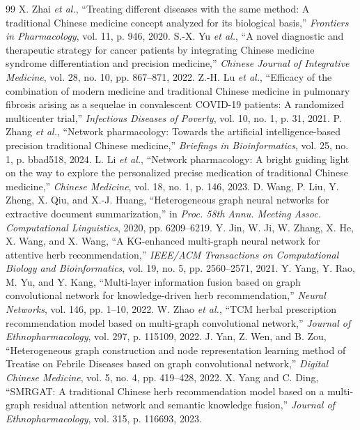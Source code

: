 \documentclass[journal,twoside,web]{ieeecolor}
\begin{document}
\begin{thebibliography}{99}
 X. Zhai \textit{et al.}, ``Treating different diseases with the same method: A traditional Chinese medicine concept analyzed for its biological basis,'' \textit{Frontiers in Pharmacology}, vol. 11, p. 946, 2020.
 S.-X. Yu \textit{et al.}, ``A novel diagnostic and therapeutic strategy for cancer patients by integrating Chinese medicine syndrome differentiation and precision medicine,'' \textit{Chinese Journal of Integrative Medicine}, vol. 28, no. 10, pp. 867--871, 2022.
 Z.-H. Lu \textit{et al.}, ``Efficacy of the combination of modern medicine and traditional Chinese medicine in pulmonary fibrosis arising as a sequelae in convalescent COVID-19 patients: A randomized multicenter trial,'' \textit{Infectious Diseases of Poverty}, vol. 10, no. 1, p. 31, 2021.
 P. Zhang \textit{et al.}, ``Network pharmacology: Towards the artificial intelligence-based precision traditional Chinese medicine,'' \textit{Briefings in Bioinformatics}, vol. 25, no. 1, p. bbad518, 2024.
 L. Li \textit{et al.}, ``Network pharmacology: A bright guiding light on the way to explore the personalized precise medication of traditional Chinese medicine,'' \textit{Chinese Medicine}, vol. 18, no. 1, p. 146, 2023.
 D. Wang, P. Liu, Y. Zheng, X. Qiu, and X.-J. Huang, ``Heterogeneous graph neural networks for extractive document summarization,'' in \textit{Proc. 58th Annu. Meeting Assoc. Computational Linguistics}, 2020, pp. 6209--6219.
 Y. Jin, W. Ji, W. Zhang, X. He, X. Wang, and X. Wang, ``A KG-enhanced multi-graph neural network for attentive herb recommendation,'' \textit{IEEE/ACM Transactions on Computational Biology and Bioinformatics}, vol. 19, no. 5, pp. 2560--2571, 2021.
 Y. Yang, Y. Rao, M. Yu, and Y. Kang, ``Multi-layer information fusion based on graph convolutional network for knowledge-driven herb recommendation,'' \textit{Neural Networks}, vol. 146, pp. 1--10, 2022.
 W. Zhao \textit{et al.}, ``TCM herbal prescription recommendation model based on multi-graph convolutional network,'' \textit{Journal of Ethnopharmacology}, vol. 297, p. 115109, 2022.
 J. Yan, Z. Wen, and B. Zou, ``Heterogeneous graph construction and node representation learning method of Treatise on Febrile Diseases based on graph convolutional network,'' \textit{Digital Chinese Medicine}, vol. 5, no. 4, pp. 419--428, 2022.
 X. Yang and C. Ding, ``SMRGAT: A traditional Chinese herb recommendation model based on a multi-graph residual attention network and semantic knowledge fusion,'' \textit{Journal of Ethnopharmacology}, vol. 315, p. 116693, 2023.

\end{thebibliography}
\end{document}
